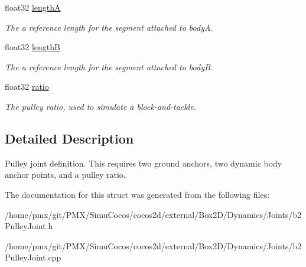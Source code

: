\begin{DoxyCompactItemize}
float32 \hyperlink{structb2PulleyJointDef_a51d945882c1d7a78af2b0e9ffb31a33b}{lengthA}
\begin{DoxyCompactList}\small\item\em The a reference length for the segment attached to bodyA. \end{DoxyCompactList}\item 
\mbox{\label{structb2PulleyJointDef_a5857d5b5b9880b6c8201ce3ee8c3eef0}} 
float32 \hyperlink{structb2PulleyJointDef_a5857d5b5b9880b6c8201ce3ee8c3eef0}{lengthB}
\begin{DoxyCompactList}\small\item\em The a reference length for the segment attached to bodyB. \end{DoxyCompactList}\item 
\mbox{\label{structb2PulleyJointDef_af35074246aeacbf239c11682642b31f5}} 
float32 \hyperlink{structb2PulleyJointDef_af35074246aeacbf239c11682642b31f5}{ratio}
\begin{DoxyCompactList}\small\item\em The pulley ratio, used to simulate a block-\/and-\/tackle. \end{DoxyCompactList}\end{DoxyCompactItemize}


\subsection{Detailed Description}
Pulley joint definition. This requires two ground anchors, two dynamic body anchor points, and a pulley ratio. 

The documentation for this struct was generated from the following files\+:\begin{DoxyCompactItemize}
\item 
/home/pmx/git/\+P\+M\+X/\+Simu\+Cocos/cocos2d/external/\+Box2\+D/\+Dynamics/\+Joints/b2\+Pulley\+Joint.\+h\item 
/home/pmx/git/\+P\+M\+X/\+Simu\+Cocos/cocos2d/external/\+Box2\+D/\+Dynamics/\+Joints/b2\+Pulley\+Joint.\+cpp\end{DoxyCompactItemize}
